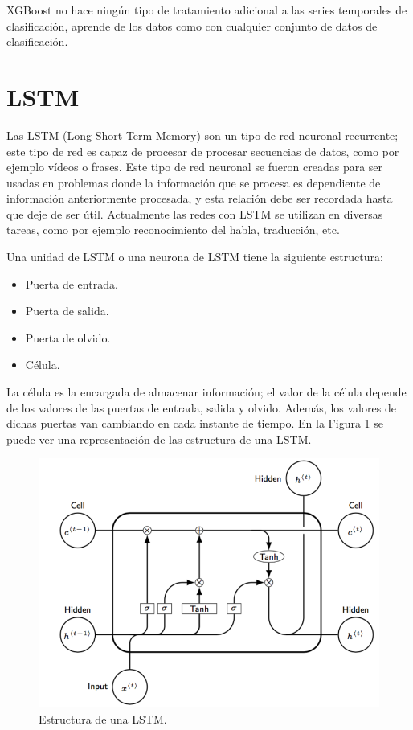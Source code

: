 XGBoost no hace ningún tipo de tratamiento adicional a las series temporales de clasificación, aprende de los datos como con cualquier conjunto de datos de clasificación.\newline

\newpage
\section{LSTM}
Las LSTM (Long Short-Term Memory) \cite{hochreiter1997long} son un tipo de red neuronal recurrente; este tipo de red es capaz de procesar de procesar secuencias de datos, como por ejemplo vídeos o frases. Este tipo de red neuronal se fueron creadas para ser usadas en problemas donde la información que se procesa es dependiente de información anteriormente procesada, y esta relación debe ser recordada hasta que deje de ser útil. Actualmente las redes con LSTM se utilizan en diversas tareas, como por ejemplo reconocimiento del habla, traducción, etc.\newline

Una unidad de LSTM o una neurona de LSTM tiene la siguiente estructura:
\begin{itemize}
	\item Puerta de entrada.
	\item Puerta de salida.
	\item Puerta de olvido.
	\item Célula.
\end{itemize}
\vspace{0.09in}
La célula es la encargada de almacenar información; el valor de la célula depende de los valores de las puertas de entrada, salida y olvido. Además, los valores de dichas puertas van cambiando en cada instante de tiempo. En la Figura \ref{fig:22} se puede ver una representación de las estructura de una LSTM.

\newpage

\begin{figure}[H]
	\centering
	\includegraphics[width=120mm]{imagenes/lstm-struct.png}
	\caption{Estructura de una LSTM.}
	\label{fig:22}
\end{figure}
\verticalspace

